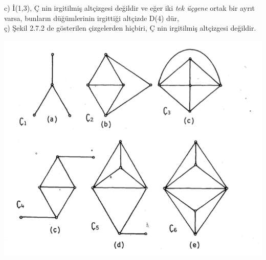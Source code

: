 \documentclass[11pt]{amsbook}
\begin{document}

    c) İ(1,3), Ç nin irgitilmiş altçizgesi değildir ve eğer iki \textit{tek üçgene} ortak bir ayrıt varsa, bunların düğümlerinin irgittiği altçizde D(4) dür,\\
    ç) Şekil 2.7.2 de gösterilen çizgelerden hiçbiri, Ç nin irgitilmiş altçizgesi değildir.


	\includegraphics{images/ceyhunPage100}
\end{document}
